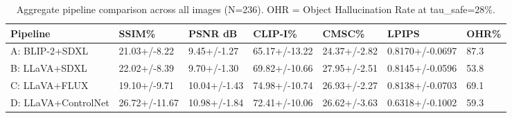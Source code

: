 \begin{table}
\caption{Aggregate pipeline comparison across all images (N=236). OHR = Object Hallucination Rate at tau\_safe=28\%.}
\label{tab:pipeline_comparison}
\begin{tabular}{lllllll}
\toprule
Pipeline & SSIM\% & PSNR dB & CLIP-I\% & CMSC\% & LPIPS & OHR\% \\
\midrule
A: BLIP-2+SDXL & 21.03+/-8.22 & 9.45+/-1.27 & 65.17+/-13.22 & 24.37+/-2.82 & 0.8170+/-0.0697 & 87.3 \\
B: LLaVA+SDXL & 22.02+/-8.39 & 9.70+/-1.30 & 69.82+/-10.66 & 27.95+/-2.51 & 0.8145+/-0.0596 & 53.8 \\
C: LLaVA+FLUX & 19.10+/-9.71 & 10.04+/-1.43 & 74.98+/-10.74 & 26.93+/-2.27 & 0.8138+/-0.0703 & 69.1 \\
D: LLaVA+ControlNet & 26.72+/-11.67 & 10.98+/-1.84 & 72.41+/-10.06 & 26.62+/-3.63 & 0.6318+/-0.1002 & 59.3 \\
\bottomrule
\end{tabular}
\end{table}

